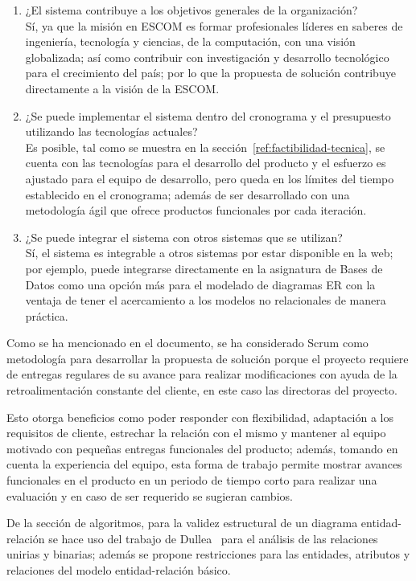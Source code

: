 \begin{enumerate}
    \item ¿El sistema contribuye a los objetivos generales de la organización?\\ Sí, ya que la misión en ESCOM es formar profesionales líderes en saberes de ingeniería, tecnología y ciencias, de la computación, con una visión globalizada; así como contribuir con investigación y desarrollo tecnológico para el crecimiento del país; por lo que la propuesta de solución contribuye directamente a la visión de la ESCOM.
    \item ¿Se puede implementar el sistema dentro del cronograma y el presupuesto utilizando las tecnologías actuales? \\Es posible, tal como se muestra en la sección~\ref{ref:factibilidad-tecnica}, se cuenta con las tecnologías para el desarrollo del producto y el esfuerzo es ajustado para el equipo de desarrollo, pero queda en los límites del tiempo establecido en el cronograma; además de ser desarrollado con una metodología ágil que ofrece productos funcionales por cada iteración.
    \item ¿Se puede integrar el sistema con otros sistemas que se utilizan?\\ Sí, el sistema es integrable a otros sistemas por estar disponible en la web; por ejemplo, puede integrarse directamente en la asignatura de Bases de Datos como una opción más para el modelado de diagramas ER con la ventaja de tener el acercamiento a los modelos no relacionales de manera práctica.
\end{enumerate}


Como se ha mencionado en el documento, se ha considerado Scrum como metodología para desarrollar la propuesta de solución porque el proyecto requiere de entregas regulares de su avance para realizar modificaciones con ayuda de la retroalimentación constante del cliente, en este caso las directoras del proyecto.


Esto otorga beneficios como poder responder con flexibilidad, adaptación a los requisitos de cliente, estrechar la relación con el mismo y mantener al equipo motivado con pequeñas entregas funcionales del producto; además, tomando en cuenta la experiencia del equipo, esta forma de trabajo permite mostrar avances funcionales en el producto en un periodo de tiempo corto para realizar una evaluación y en caso de ser requerido se sugieran cambios.


De la sección de algoritmos, para la validez estructural de un diagrama entidad-relación se hace uso del trabajo de Dullea~\cite{dullea_analysis_2003} para el análisis de las relaciones unirias y binarias; además se propone restricciones para las entidades, atributos y relaciones del modelo entidad-relación básico.


